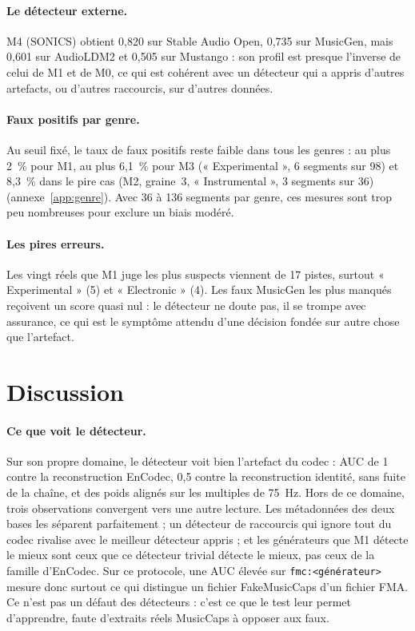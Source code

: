 \documentclass[a4paper, 11pt]{article}
\begin{document}
\paragraph{Le détecteur externe.} M4 (SONICS) obtient 0,820 sur Stable Audio Open, 0,735 sur MusicGen, mais
0,601 sur AudioLDM2 et 0,505 sur Mustango : son profil est presque l'inverse de celui de M1 et de M0, ce qui
est cohérent avec un détecteur qui a appris d'autres artefacts, ou d'autres raccourcis, sur d'autres données.

\paragraph{Faux positifs par genre.} Au seuil fixé, le taux de faux positifs reste faible dans tous les
genres : au plus 2~\% pour M1, au plus 6,1~\% pour M3 (« Experimental », 6 segments sur 98) et 8,3~\% dans
le pire cas (M2, graine~3, « Instrumental », 3 segments sur 36) (annexe~\ref{app:genre}). Avec 36 à 136
segments par genre, ces mesures sont trop peu nombreuses pour exclure un biais modéré.

\paragraph{Les pires erreurs.} Les vingt réels que M1 juge les plus suspects viennent de 17 pistes, surtout
« Experimental » (5) et « Electronic » (4). Les faux MusicGen les plus manqués reçoivent un score
quasi nul : le détecteur ne doute pas, il se trompe avec assurance, ce qui est le symptôme attendu d'une
décision fondée sur autre chose que l'artefact.

\section{Discussion}
\label{sec:discussion}

\paragraph{Ce que voit le détecteur.} Sur son propre domaine, le détecteur voit bien l'artefact du codec :
AUC de 1 contre la reconstruction EnCodec, 0,5 contre la reconstruction identité, sans fuite de la chaîne,
et des poids alignés sur les multiples de 75~Hz.
Hors de ce domaine, trois observations convergent vers une autre lecture. Les métadonnées des deux bases
les séparent parfaitement ; un détecteur de raccourcis qui ignore tout du codec rivalise avec le meilleur
détecteur appris ; et les générateurs que M1 détecte le mieux sont ceux que ce détecteur trivial
détecte le mieux, pas ceux de la famille d'EnCodec. Sur ce protocole, une AUC élevée sur \texttt{fmc:<générateur>} mesure donc surtout ce qui
distingue un fichier FakeMusicCaps d'un fichier FMA. Ce n'est pas un défaut des détecteurs : c'est ce que
le test leur permet d'apprendre, faute d'extraits réels MusicCaps à opposer aux faux.
\end{document}
